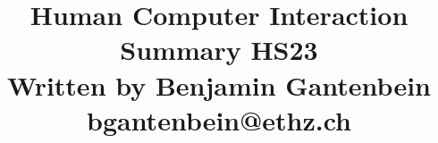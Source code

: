 \documentclass[10pt, landscape, a4paper]{article}
\title{Human Computer Interaction Summary HS23 \\ \vspace{10pt} \large Written by Benjamin Gantenbein bgantenbein@ethz.ch}
\begin{document}
\begin{multicols*}{3}

\date{}
\maketitle





























\end{multicols*}
\end{document}
